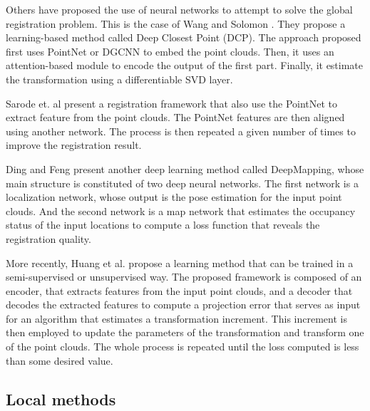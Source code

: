         Others have proposed the use of neural networks to attempt to solve the global registration problem.
        This is the case of Wang and Solomon \cite{Wang_2019_deepclosest}. They propose a learning-based method called Deep Closest Point (DCP).
        The approach proposed first uses PointNet \cite{Qi_2017_pointnetdeep} or DGCNN \cite{Wang_2019_dynamic} to embed the point clouds.
        Then, it uses an attention-based module to encode the output of the first part.
        Finally, it estimate the transformation using a differentiable SVD layer.

        Sarode et. al \cite{Sarode_2019_oneframework} present a registration framework that also use the PointNet to extract feature from the point clouds.
        The PointNet features are then aligned using another network. The process is then repeated a given number of times to improve the registration result.
        
        Ding and Feng \cite{Ding_2019_deepmapping} present another deep learning method called DeepMapping,
        whose main structure is constituted of two deep neural networks.
        The first network is a localization network, whose output is the pose estimation for the input point clouds.
        And the second network is a map network that estimates the occupancy status of the input locations to compute a loss function that reveals
        the registration quality.

        More recently, Huang et al. \cite{Huang_2020_feature} propose a learning method that can be trained in a semi-supervised or unsupervised way.
        The proposed framework is composed of an encoder, that extracts features from the input point clouds, 
        and a decoder that decodes the extracted features to compute a projection error that serves as input for an algorithm that estimates
        a transformation increment. 
        This increment is then employed to update the parameters of the transformation and transform one of the point clouds.
        The whole process is repeated until the loss computed is less than some desired value.

        \subsection{Local methods}

